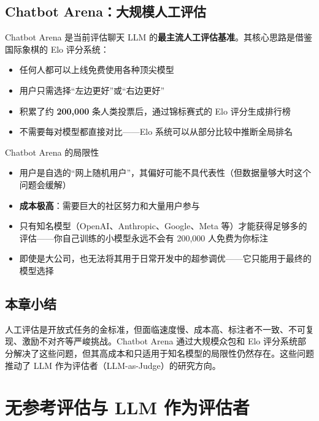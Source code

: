 \documentclass[a4paper]{article}
\begin{document}
\subsection{Chatbot Arena：大规模人工评估}





Chatbot Arena 是当前评估聊天 LLM 的\textbf{最主流人工评估基准}。其核心思路是借鉴国际象棋的 Elo 评分系统：

\begin{itemize}
    \item 任何人都可以上线免费使用各种顶尖模型
    \item 用户只需选择``左边更好''或``右边更好''
    \item 积累了约 \textbf{200,000} 条人类投票后，通过锦标赛式的 Elo 评分生成排行榜
    \item 不需要每对模型都直接对比——Elo 系统可以从部分比较中推断全局排名
\end{itemize}

\begin{warningbox}{Chatbot Arena 的局限性}
\begin{itemize}
    \item 用户是自选的``网上随机用户''，其偏好可能不具代表性（但数据量够大时这个问题会缓解）
    \item \textbf{成本极高}：需要巨大的社区努力和大量用户参与
    \item 只有知名模型（OpenAI、Anthropic、Google、Meta 等）才能获得足够多的评估——你自己训练的小模型永远不会有 200,000 人免费为你标注
    \item 即使是大公司，也无法将其用于日常开发中的超参调优——它只能用于最终的模型选择
\end{itemize}
\end{warningbox}

\subsection{本章小结}

人工评估是开放式任务的金标准，但面临速度慢、成本高、标注者不一致、不可复现、激励不对齐等严峻挑战。Chatbot Arena 通过大规模众包和 Elo 评分系统部分解决了这些问题，但其高成本和只适用于知名模型的局限性仍然存在。这些问题推动了 LLM 作为评估者（LLM-as-Judge）的研究方向。


\section{无参考评估与 LLM 作为评估者}
\end{document}

